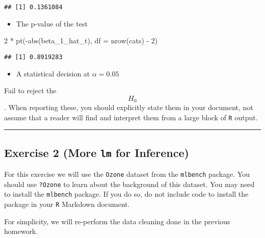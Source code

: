 \documentclass[
]{article}
\newenvironment{Shaded}{\begin{snugshade}}{\end{snugshade}}
\newcommand{\AttributeTok}[1]{\textcolor[rgb]{0.77,0.63,0.00}{#1}}
\newcommand{\DecValTok}[1]{\textcolor[rgb]{0.00,0.00,0.81}{#1}}
\newcommand{\FunctionTok}[1]{\textcolor[rgb]{0.00,0.00,0.00}{#1}}
\newcommand{\NormalTok}[1]{#1}
\newcommand{\SpecialCharTok}[1]{\textcolor[rgb]{0.00,0.00,0.00}{#1}}
\providecommand{\tightlist}{%
  \setlength{\itemsep}{0pt}\setlength{\parskip}{0pt}}
\begin{document}
\begin{verbatim}
## [1] 0.1361084
\end{verbatim}

\begin{itemize}
\tightlist
\item
  The p-value of the test
\end{itemize}

\begin{Shaded}
\begin{Highlighting}[]
\DecValTok{2} \SpecialCharTok{*} \FunctionTok{pt}\NormalTok{(}\SpecialCharTok{{-}}\FunctionTok{abs}\NormalTok{(beta\_1\_hat\_t), }\AttributeTok{df =} \FunctionTok{nrow}\NormalTok{(cats) }\SpecialCharTok{{-}} \DecValTok{2}\NormalTok{)}
\end{Highlighting}
\end{Shaded}

\begin{verbatim}
## [1] 0.8919283
\end{verbatim}

\begin{itemize}
\tightlist
\item
  A statistical decision at \(\alpha = 0.05\)
\end{itemize}

Fail to reject the \[H_0\]. When reporting these, you should explicitly
state them in your document, not assume that a reader will find and
interpret them from a large block of \texttt{R} output.

\begin{center}\rule{0.5\linewidth}{0.5pt}\end{center}

\hypertarget{exercise-2-more-lm-for-inference}{%
\subsection{\texorpdfstring{Exercise 2 (More \texttt{lm} for
Inference)}{Exercise 2 (More lm for Inference)}}\label{exercise-2-more-lm-for-inference}}

For this exercise we will use the \texttt{Ozone} dataset from the
\texttt{mlbench} package. You should use \texttt{?Ozone} to learn about
the background of this dataset. You may need to install the
\texttt{mlbench} package. If you do so, do not include code to install
the package in your \texttt{R} Markdown document.

For simplicity, we will re-perform the data cleaning done in the
previous homework.
\end{document}
